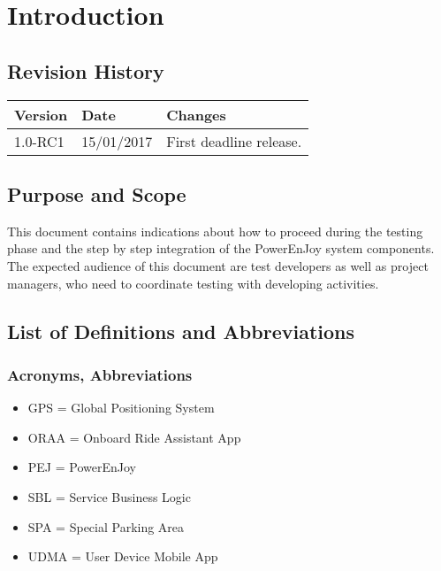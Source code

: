 \section{Introduction}

\subsection{Revision History}
\begin{tabular}{| l | l | p{10cm} |}
\hline
\textbf{Version} & \textbf{Date} & \textbf{Changes}\\
\hline
1.0-RC1 & 15/01/2017 & First deadline release.\\
\hline
\end{tabular}

\subsection{Purpose and Scope}
This document contains indications about how to proceed during the testing phase and the step by step integration of the PowerEnJoy system components. The expected audience of this document are test developers as well as project managers, who need to coordinate testing with developing activities. 

\subsection{List of Definitions and Abbreviations}
\subsubsection{Acronyms, Abbreviations}
\begin{itemize}
    \item GPS = Global Positioning System
    \item ORAA = Onboard Ride Assistant App
    \item PEJ = PowerEnJoy
    \item SBL = Service Business Logic
    \item SPA = Special Parking Area
    \item UDMA = User Device Mobile App
\end{itemize}

